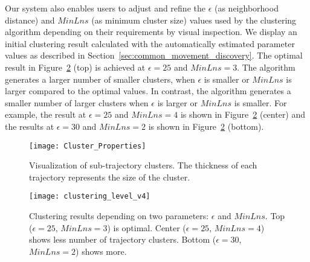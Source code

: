Our system also enables users to adjust and refine the $\epsilon$ (as neighborhood distance) and $MinLns$ (as minimum cluster size) values used by the clustering algorithm depending on their requirements by visual inspection.
We display an initial clustering result calculated with the automatically estimated parameter values as described in Section~\ref{sec:common_movement_discovery}.
The optimal result in Figure~\ref{fig:clustering_level} (top) is achieved at $\epsilon=25$ and $MinLns=3$.
The algorithm generates a larger number of smaller clusters, when $\epsilon$ is smaller or $MinLns$ is larger compared to the optimal values.
In contrast, the algorithm generates a smaller number of larger clusters when $\epsilon$ is larger or $MinLns$ is smaller.
For example, the result at $\epsilon=25$ and $MinLns=4$ is shown in Figure~\ref{fig:clustering_level} (center) and the results at $\epsilon=30$ and $MinLns=2$ is shown in Figure~\ref{fig:clustering_level} (bottom).

\begin{figure}[tb]
	\centering
	\texttt{[image: Cluster\_Properties]}
	\caption{Visualization of sub-trajectory clusters. The thickness of each trajectory represents the size of the cluster.
	}
	\label{fig:cluster_properties}
\end{figure}


\begin{figure}[tb]
	\centering
	\texttt{[image: clustering\_level\_v4]}
	\caption{Clustering results depending on two parameters: $\epsilon$ and $MinLns$.
	Top ($\epsilon=25$, $MinLns=3$) is optimal.
	Center ($\epsilon=25$, $MinLns=4$) shows less number of trajectory clusters. Bottom ($\epsilon=30$, $MinLns=2$) shows more.
	}
	\label{fig:clustering_level}
\end{figure}

%
%


